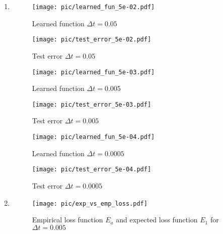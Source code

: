 \documentclass[a4paper,11pt]{scrartcl}
\newcommand*{\Dt}{\Delta{}t}
\begin{document}
\begin{enumerate}
\begin{enumerate}[leftmargin=1em]
  \item
    \begin{figure}[H]
        \begin{minipage}[b]{.5\linewidth}
          \centering
          \texttt{[image: pic/learned\_fun\_5e-02.pdf]}
          \caption{Learned function $\Dt=0.05$}
          \label{fig:learned_fun_0.05}
        \end{minipage}%
        \begin{minipage}[b]{.5\linewidth}
          \centering
          \texttt{[image: pic/test\_error\_5e-02.pdf]}
          \caption{Test error $\Dt=0.05$}
          \label{fig:test_error_0.05}
        \end{minipage}
    \end{figure}
    \begin{figure}[H]
        \begin{minipage}[b]{.5\linewidth}
          \centering
          \texttt{[image: pic/learned\_fun\_5e-03.pdf]}
          \caption{Learned function $\Dt=0.005$}
          \label{fig:learned_fun_0.005}
        \end{minipage}%
        \begin{minipage}[b]{.5\linewidth}
          \centering
          \texttt{[image: pic/test\_error\_5e-03.pdf]}
          \caption{Test error $\Dt=0.005$}
          \label{fig:test_error_0.005}
        \end{minipage}
    \end{figure}
    \begin{figure}[H]
        \begin{minipage}[b]{.5\linewidth}
          \centering
          \texttt{[image: pic/learned\_fun\_5e-04.pdf]}
          \caption{Learned function $\Dt=0.0005$}
          \label{fig:learned_fun_0.0005}
        \end{minipage}%
        \begin{minipage}[b]{.5\linewidth}
          \centering
          \texttt{[image: pic/test\_error\_5e-04.pdf]}
          \caption{Test error $\Dt=0.0005$}
          \label{fig:test_error_0.0005}
        \end{minipage}
    \end{figure}

  \item
    \begin{figure}[H]
      \centering
      \texttt{[image: pic/exp\_vs\_emp\_loss.pdf]}
      \caption{Empirical loss function $E_a$ and expected loss function $E_1$
        for $\Dt = 0.005$}
      \label{fig:empirical_loss}
    \end{figure}


\end{enumerate}
\end{enumerate}
\end{document}
